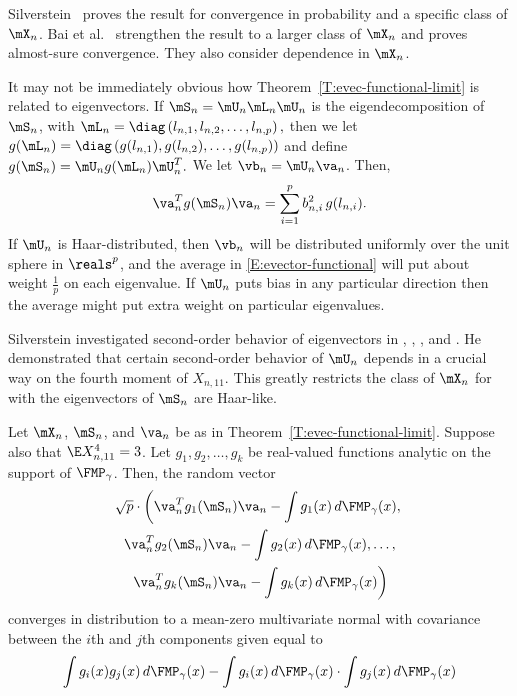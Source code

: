 \noindent
Silverstein~\cite{silverstein1979reg} proves the result for convergence in probability and a specific class of $\mX_n$.  Bai et al.~\cite{bai2007ael} strengthen the result to a larger class of $\mX_n$ and proves almost-sure convergence.  They also consider dependence in $\mX_n$.

It may not be immediately obvious how Theorem~\ref{T:evec-functional-limit}
is related to eigenvectors.  If $\mS_n = \mU_n \mL_n \mU_n$ is the
eigendecomposition of $\mS_n$, with 
\(
    \mL_n
    = 
    \diag\left(
        l_{n,1}, l_{n,2}, \ldots, l_{n,p}
    \right),
\)
then we let 
\(
    g(\mL_n)
    =
    \diag \left(
        g(l_{n,1}), g(l_{n,2}), \ldots, g(l_{n,p})
    \right)
\)
and define
\(
    g(\mS_n)
    =
    \mU_n
    g(\mL_n)
    \mU_n^T.
\)
We let $\vb_n = \mU_n \va_n$.  Then,
\begin{equation}\label{E:evector-functional}
    \va_n^T g(\mS_n) \va_n
    =
    \sum_{i=1}^p
        b_{n,i}^2
        \,
        g( l_{n,i} ).
\end{equation}
If $\mU_n$ is Haar-distributed, then $\vb_n$ will be distributed uniformly over the unit sphere in $\reals^p$, and the average in \eqref{E:evector-functional} will put about weight $\frac{1}{p}$ on each eigenvalue.  If $\mU_n$ puts bias in any particular direction then the average might put extra weight on particular eigenvalues.

Silverstein investigated second-order behavior of eigenvectors in \cite{silverstein1981dbe}, \cite{silverstein1984slt}, \cite{silverstein1989eld}, and \cite{silverstein1990wcr}.  He demonstrated that certain second-order behavior of $\mU_n$ depends in a crucial way on the fourth moment of $X_{n,11}$.  This greatly restricts the class of $\mX_n$ for with the eigenvectors of $\mS_n$ are Haar-like.

\begin{theorem}\label{T:evec-functional-scaled-limit}
    Let $\mX_n$, $\mS_n$, and $\va_n$ be as in 
    Theorem~\ref{T:evec-functional-limit}. Suppose also that
    $\E X_{n,11}^4 = 3$.  Let $g_1, g_2, \ldots, g_k$
    be real-valued functions analytic on the support of $\FMP_\gamma$.  
    Then, the random vector
    \begin{multline*}
        \sqrt{p} \cdot
        \left(
            \va_n^T g_1( \mS_n ) \va_n
            -
            \int g_1(x) \, d\FMP_\gamma(x), \right. \\
            \va_n^T g_2( \mS_n ) \va_n
            -
            \int g_2(x) \, d\FMP_\gamma(x),
            \ldots, \\ \left.
            \va_n^T g_k( \mS_n ) \va_n
            -
            \int g_k(x) \, d\FMP_\gamma(x)
        \right)
    \end{multline*}
    converges in distribution to a mean-zero multivariate normal with
    covariance between the $i$th and $j$th components given equal to
    \[
        \int
            g_i(x) g_j(x) \, d\FMP_\gamma(x)
        -
        \int
            g_i(x) \, d\FMP_\gamma(x)
        \cdot
        \int
            g_j(x) \, d\FMP_\gamma(x)
    \]
\end{theorem}


